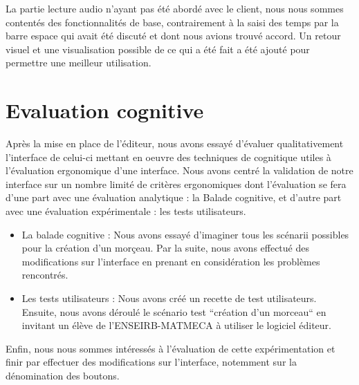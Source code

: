 \indent La partie lecture audio n'ayant pas été abordé avec le client, nous nous sommes contentés des fonctionnalités de base, contrairement à la saisi des temps par la barre espace qui avait été discuté et dont nous avions trouvé accord. Un retour visuel et une visualisation possible de ce qui a été fait a été ajouté pour permettre une meilleur utilisation.

\section{Evaluation cognitive}

\indent Après la mise en place de l'éditeur, nous avons essayé d'évaluer qualitativement l'interface de celui-ci mettant en oeuvre des techniques de cognitique utiles à l’évaluation ergonomique d’une interface. Nous avons centré la validation de notre
interface sur un nombre limité de critères ergonomiques dont l’évaluation se fera d’une part avec une évaluation analytique : la Balade cognitive, et d’autre part avec une évaluation expérimentale : les tests utilisateurs.

\begin{itemize}

\item La balade cognitive :  Nous avons essayé d'imaginer tous les scénarii possibles pour la création d'un morçeau. Par la suite, nous avons effectué des modifications sur l'interface en prenant en considération les problèmes rencontrés.
\item Les tests utilisateurs : Nous avons créé un recette de test utilisateurs. Ensuite, nous avons déroulé le scénario test
``création d'un morceau`` en invitant un élève de l'ENSEIRB-MATMECA à utiliser le logiciel éditeur.
\end{itemize}

Enfin, nous nous sommes intéressés à l’évaluation de cette expérimentation et finir par effectuer des modifications sur l'interface, notemment sur la dénomination des boutons.
